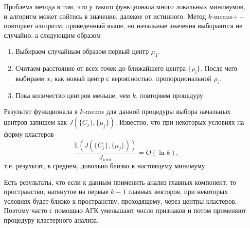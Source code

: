 \medskip
Проблема метода в том, что у такого функционала много локальных минимумов, и алгоритм может сойтись в значение, далекое от истинного.
Метод $k$-means$++$ повторяет алгоритм, приведенный выше, но начальные значения выбираются не случайно, а следующим образом
\begin{enumerate}
\item Выбираем случайным образом первый центр $\mu_1$.
\item Считаем расстояние от всех точек до ближайшего центра $\{\rho_i\}$. После чего выбираем $x_i$ как новый центр с вероятностью, пропорциональной $\rho_i$.
\item Пока количество центров меньше, чем $k$, повторяем процедуру.
\end{enumerate}
Результат функционала в $k$-means для данной процедуры выбора начальных центров запишем как $J(\{C_j\}, \{\mu_j\})$.
Известно, что при некоторых условиях на форму кластеров
\begin{equation*}
\frac{\mathbb{E}(J(\{C_j\}, \{\mu_j\}))}{J_{min}} = O(\ln k ),
\end{equation*}
т.е. результат, в среднем, довольно близко к настоящему минимуму.

\begin{note}
Есть результаты, что если к данным применить анализ главных компонент, то пространство, натянутое на первые $k-1$ главных векторов, при некоторых условиях будет близко к пространству, проходящему, через центры кластеров. Поэтому часто с помощью АГК уменьшают число признаков и потом применяют процедуру кластерного анализа.
\end{note}

